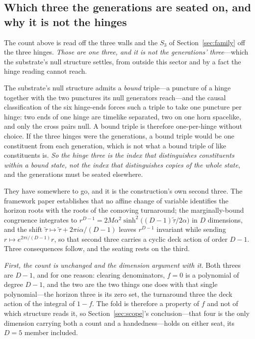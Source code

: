 \documentclass[11pt]{article}
\begin{document}
\subsection{Which three the generations are seated on, and why it is not the hinges}\label{sec:whichthree}

The count above is read off the three walls and the $S_3$ of Section~\ref{sec:family} off the three hinges. \emph{Those are
one three, and it is not the generations' three}---which the substrate's null structure settles, from
outside this sector and by a fact the hinge reading cannot reach.

The substrate's null structure admits a \emph{bound} triple---a puncture of a hinge together with the two
punctures its null generators reach---and the causal classification of the six hinge-ends forces such a triple
to take one puncture per hinge: two ends of one hinge are timelike separated, two on one horn spacelike, and
only the cross pairs null. A bound triple is therefore one-per-hinge without
choice. If the three hinges were the generations, a bound triple would be one constituent from each
generation, which is not what a bound triple of like constituents is. \emph{So the hinge three is the index
that distinguishes constituents within a bound state, not the index that distinguishes copies of the whole
state}, and the generations must be seated elsewhere.

They have somewhere to go, and it is the construction's own second three. The framework paper establishes that
no affine change of variable identifies the horizon roots with the roots of the comoving turnaround; the marginally-bound congruence integrates to $r^{D-1}=2M\alpha^{2}\sinh^{2}\bigl((D-1)\tilde\tau/2\alpha\bigr)$
in $D$ dimensions, and the shift $\tilde\tau\mapsto\tilde\tau+2\pi i\alpha/(D-1)$ leaves $r^{D-1}$ invariant while
sending $r\mapsto e^{2\pi i/(D-1)}r$, so that second three carries a cyclic deck action of order
$D-1$. Three consequences follow, and the seating rests on the
third.

\emph{First, the count is unchanged and the dimension argument with it.} Both threes are $D-1$, and for one
reason: clearing denominators, $f=0$ is a polynomial of degree $D-1$, and the two are the two things one does
with that single polynomial---the horizon three is its zero set, the turnaround three the deck action of the
integral of $1-f$. The fold is therefore a property of $f$ and not of which structure reads it, so
Section~\ref{sec:scope}'s conclusion---that four is the only dimension carrying both a count and a
handedness---holds on either seat, its $D=5$ member included.
\end{document}

